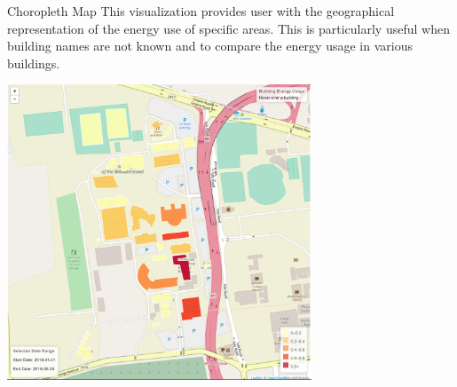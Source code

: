\documentclass[8pt,xcolor={dvipsnames}]{beamer}
\begin{document}
{\begin{frame}{Choropleth Map}
This visualization provides user with the geographical representation of the energy use of specific areas. This is particularly useful when building names are not known and to compare the energy usage in various buildings.

	\begin{center}
		\includegraphics[width=0.68\textwidth, trim=0 0 0 0, clip]{ChoroplethMap}
	\end{center}



\end{frame}}
\end{document}
